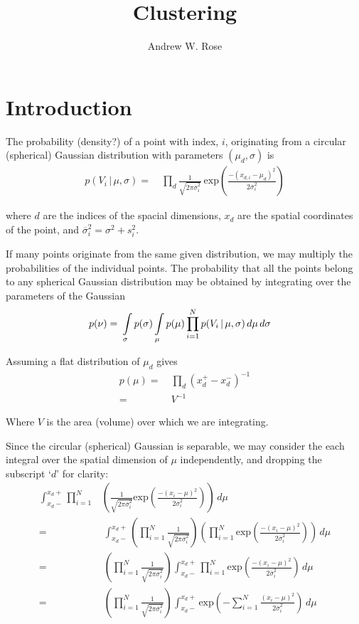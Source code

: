 \documentclass{article}
\title{Clustering}
\author{Andrew W. Rose}
\newcommand{\sig}{\overline{\sigma}_i}
\newcommand{\eq}{=&\ }
\newcommand{\ints}{\int\displaylimits_\sigma}
\newcommand{\intm}{\int\displaylimits_\mu}
\begin{document}
\maketitle

\section{Introduction}

The probability (density?) of a point with index, $i$, originating from a circular (spherical) Gaussian distribution with parameters $(\mu_d,\sigma)$ is
\begin{align}
  p(V_{i}\,|\,\mu,\sigma) \eq \prod_d \frac{1}{\sqrt{2\pi\sig^2}}\ \text{exp}\left( \frac{-(x_{d,i}-\mu_d)^2 }{ 2\sig^2 }\right)
\end{align}

where $d$ are the indices of the spacial dimensions, $x_d$ are the spatial coordinates of the point, and $\sig^2 = \sigma^2 + s_i^2$.

If many points originate from the same given distribution, we may multiply the probabilities of the individual points. The probability that all the points belong to any spherical Gaussian distribution may be obtained by integrating over the parameters of the Gaussian  
\begin{align}
  p( \nu ) \eq \ints p(\sigma) \intm p(\mu) \prod_{i=1}^{N} p(V_{i}\,|\,\mu,\sigma)\,d\mu\,d\sigma
\end{align}

Assuming a flat distribution of $\mu_d$ gives
\begin{align}
  p(\mu) \eq \prod_d (x_d^+ - x_d^-)^{-1} \\
         \eq V^{-1}
\end{align}

Where $V$ is the area (volume) over which we are integrating.

Since the circular (spherical) Gaussian is separable, we may consider the each integral over the spatial dimension of $\mu$ independently, and dropping the subscript `$d$' for clarity:
\begin{align}
  \int_{x_d-}^{x_d+} \prod_{i=1}^{N} & \left( \frac{1}{\sqrt{2\pi\sig^2}} \text{exp}\left( \frac{-(x_i-\mu)^2 }{ 2\sig^2 }\right)\right)\,d\mu \nonumber \\
    \eq \int_{x_d-}^{x_d+} \left(\prod_{i=1}^{N} \frac{1}{\sqrt{2\pi\sig^2}}\right)\left(\prod_{i=1}^{N} \text{exp}\left( \frac{-(x_i-\mu)^2 }{ 2\sig^2 }\right)\right)\,d\mu \\
    \eq \left(\prod_{i=1}^{N} \frac{1}{\sqrt{2\pi\sig^2}}\right) \int_{x_d-}^{x_d+} \prod_{i=1}^{N} \text{exp}\left( \frac{-(x_i-\mu)^2 }{ 2\sig^2 }\right)\,d\mu \\
    \eq \left(\prod_{i=1}^{N} \frac{1}{\sqrt{2\pi\sig^2}}\right) \int_{x_d-}^{x_d+} \text{exp}\left( -\sum_{i=1}^{N} \frac{(x_i-\mu)^2 }{ 2\sig^2 }\right)\,d\mu
\end{align}
\end{document}
